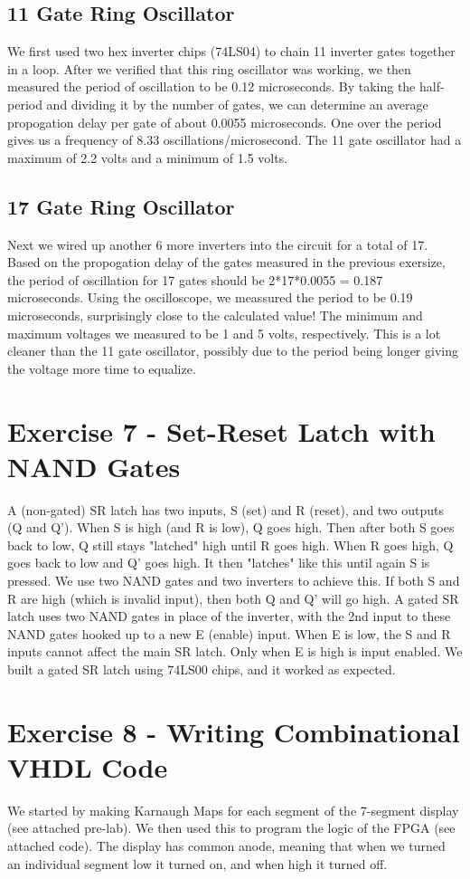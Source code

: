 \documentclass[paper=letter, fontsize=11pt]{scrartcl}
\begin{document}
\subsection{11 Gate Ring Oscillator}
We first used two hex inverter chips (74LS04) to chain 11 inverter gates together in a loop.
After we verified that this ring oscillator was working, we then measured the period of oscillation to be 0.12 microseconds. By taking the half-period and dividing it by the number of gates, we can determine an average propogation delay per gate of about 0.0055 microseconds. One over the period gives us a frequency of 8.33 oscillations/microsecond. The 11 gate oscillator had a maximum of 2.2 volts and a minimum of 1.5 volts.
\subsection{17 Gate Ring Oscillator}
Next we wired up another 6 more inverters into the circuit for a total of 17. Based on the propogation delay of the gates measured in the previous exersize, the period of oscillation for 17 gates should be 2*17*0.0055 = 0.187 microseconds. Using the oscilloscope, we meassured the period to be 0.19 microseconds, surprisingly close to the calculated value! The minimum and maximum voltages we measured to be 1 and 5 volts, respectively. This is a lot cleaner than the 11 gate oscillator, possibly due to the period being longer giving the voltage more time to equalize. 

\section{Exercise 7 - Set-Reset Latch with NAND Gates}
A (non-gated) SR latch has two inputs, S (set) and R (reset), and two outputs (Q and Q'). When S is high (and R is low), Q goes high. Then after both S goes back to low, Q still stays "latched" high until R goes high. When R goes high, Q goes back to low and Q' goes high. It then "latches" like this until again S is pressed. We use two NAND gates and two inverters to achieve this. If both S and R are high (which is invalid input), then both Q and Q' will go high. A gated SR latch uses two NAND gates in place of the inverter, with the 2nd input to these NAND gates hooked up to a new E (enable) input. When E is low, the S and R inputs cannot affect the main SR latch. Only when E is high is input enabled. We built a gated SR latch using 74LS00 chips, and it worked as expected.

\section{Exercise 8 - Writing Combinational VHDL Code}
We started by making Karnaugh Maps for each segment of the 7-segment display (see attached pre-lab). We then used this to program the logic of the FPGA (see attached code). The display has common anode, meaning that when we turned an individual segment low it turned on, and when high it turned off.

\end{document}

